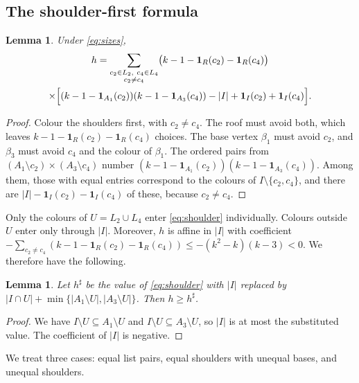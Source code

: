 \documentclass[11pt]{amsart}
\newtheorem{lemma}[theorem]{Lemma}
\theoremstyle{definition}
\theoremstyle{remark}
\newcommand{\1}{\mathbf 1}
\begin{document}
\subsection{The shoulder-first formula}
\begin{lemma}\label{lem:shoulder}
Under \eqref{eq:sizes},
\begin{multline}\label{eq:shoulder}
h=\sum_{\substack{c_2\in L_2,\ c_4\in L_4\\ c_2\neq c_4}}
\bigl(k-1-\1_R(c_2)-\1_R(c_4)\bigr)\\
\times\Bigl[(k-1-\1_{A_1}(c_2))(k-1-\1_{A_3}(c_4))-|I|+\1_I(c_2)+\1_I(c_4)\Bigr].
\end{multline}
\end{lemma}
\begin{proof}
Colour the shoulders first, with $c_2\ne c_4$. The roof must avoid both, which leaves
$k-1-\1_R(c_2)-\1_R(c_4)$ choices. The base vertex $\beta_1$ must avoid $c_2$, and $\beta_3$ must avoid
$c_4$ and the colour of $\beta_1$. The ordered pairs from $(A_1\setminus c_2)\times(A_3\setminus c_4)$
number $(k-1-\1_{A_1}(c_2))(k-1-\1_{A_3}(c_4))$. Among them, those with equal entries correspond to the
colours of $I\setminus\{c_2,c_4\}$, and there are $|I|-\1_I(c_2)-\1_I(c_4)$ of these, because
$c_2\neq c_4$.
\end{proof}

Only the colours of $U=L_2\cup L_4$ enter \eqref{eq:shoulder} individually. Colours outside $U$ enter
only through $|I|$. Moreover, $h$ is affine in $|I|$ with coefficient
$-\sum_{c_2\ne c_4}(k-1-\1_R(c_2)-\1_R(c_4))\le -(k^2-k)(k-3)<0$. We therefore have the following.

\begin{lemma}\label{lem:Ibound}
Let $h^{\sharp}$ be the value of \eqref{eq:shoulder} with $|I|$ replaced by
$|I\cap U|+\min\{|A_1\setminus U|,|A_3\setminus U|\}$. Then $h\ge h^{\sharp}$.
\end{lemma}
\begin{proof}
We have $I\setminus U\subseteq A_1\setminus U$ and $I\setminus U\subseteq A_3\setminus U$, so $|I|$ is at
most the substituted value. The coefficient of $|I|$ is negative.
\end{proof}

We treat three cases: equal list pairs, equal shoulders with unequal bases, and unequal shoulders.
\end{document}
